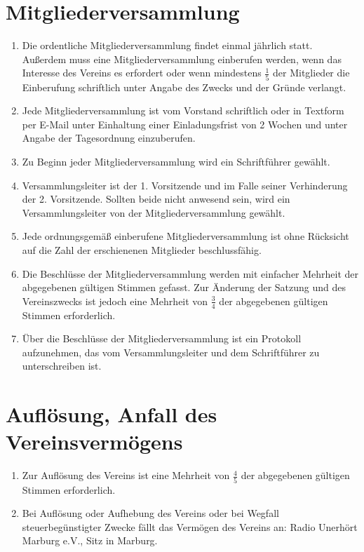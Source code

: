 \documentclass[10pt,conference,a4paper,nofonttune]{IEEEtran}
\begin{document}
\section{Mitgliederversammlung}
\begin{enumerate}
  \item Die ordentliche Mitgliederversammlung findet einmal jährlich statt.
    Außerdem muss eine Mitgliederversammlung einberufen werden, wenn das
    Interesse des Vereins es erfordert oder wenn mindestens $\frac{1}{5}$ der
    Mitglieder die Einberufung schriftlich unter Angabe des Zwecks und der
    Gründe verlangt.

  \item Jede Mitgliederversammlung ist vom Vorstand schriftlich oder in Textform
    per E-Mail unter Einhaltung einer Einladungsfrist von 2 Wochen und unter
    Angabe der Tagesordnung einzuberufen.

  \item Zu Beginn jeder Mitgliederversammlung wird ein Schriftführer gewählt.

  \item Versammlungsleiter ist der 1. Vorsitzende und im Falle seiner
    Verhinderung der 2. Vorsitzende. Sollten beide nicht anwesend sein, wird ein
    Versammlungsleiter von der Mitgliederversammlung gewählt.

  \item Jede ordnungsgemäß einberufene Mitgliederversammlung ist ohne Rücksicht
    auf die Zahl der erschienenen Mitglieder beschlussfähig.

  \item Die Beschlüsse der Mitgliederversammlung werden mit einfacher Mehrheit
    der abgegebenen gültigen Stimmen gefasst. Zur Änderung der Satzung und des
    Vereinszwecks ist jedoch eine Mehrheit von $\frac{3}{4}$ der abgegebenen
    gültigen Stimmen erforderlich.

  \item Über die Beschlüsse der Mitgliederversammlung ist ein Protokoll
    aufzunehmen, das vom Versammlungsleiter und dem Schriftführer zu
    unterschreiben ist.
\end{enumerate}


\section{Auflösung, Anfall des Vereinsvermögens}
\begin{enumerate}
  \item Zur Auflösung des Vereins ist eine Mehrheit von $\frac{4}{5}$ der
    abgegebenen gültigen Stimmen erforderlich.

  \item Bei Auflösung oder Aufhebung des Vereins oder bei Wegfall
    steuerbegünstigter Zwecke fällt das Vermögen des Vereins an:
    Radio Unerhört Marburg e.V., Sitz in Marburg.
\end{enumerate}
\end{document}
